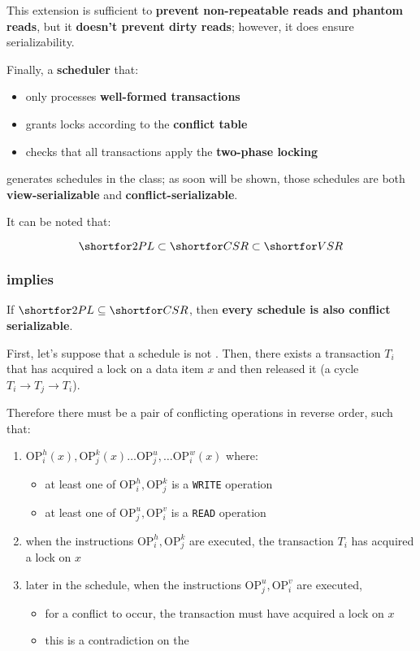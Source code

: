\documentclass[english]{article}
\begin{document}
This extension is sufficient to \textbf{prevent non-repeatable reads and phantom reads}, but it \textbf{doesn't prevent dirty reads};
however, it does ensure serializability.

\bigskip
Finally, a \textbf{scheduler} that:

\begin{itemize}
  \item only processes \textbf{well-formed transactions}
  \item grants locks according to the \textbf{conflict table}
  \item checks that all transactions apply the \textbf{two-phase locking}
\end{itemize}

generates schedules in the \tpl class;
as soon will be shown, those schedules are both \textbf{view-serializable} and \textbf{conflict-serializable}.

It can be noted that:

\[ \tpl \subset \csr \subset \vsr \]

\subsubsection{\tpl implies \csr}

If \(\tpl \subseteq \csr\), then \textbf{every \tpl schedule is also conflict serializable}.

\bigskip
First, let's suppose that a \tpl schedule is not \csr.
Then, there exists a transaction \(T_i\) that has acquired a lock on a data item \(x\) and then released it (a cycle \(T_i \rightarrow T_j \rightarrow T_i\)).

Therefore there must be a pair of conflicting operations in reverse order, such that:

\begin{enumerate}
  \item \(\text{OP}_{i}^{h}(x), \text{OP}_{j}^{k}(x) \ldots \text{OP}_{j}^{u}, \ldots \text{OP}_{i}^{w}(x)\) where:
        \begin{itemize}
          \item at least one of \(\text{OP}_{i}^{h}, \text{OP}_{j}^{k}\) is a \texttt{WRITE} operation
          \item at least one of \(\text{OP}_{j}^{u}, \text{OP}_{i}^{v}\) is a \texttt{READ} operation
        \end{itemize}
  \item when the instructions \(\text{OP}_{i}^{h}, \text{OP}_{j}^{k}\) are executed, the transaction \(T_i\) has acquired a lock on \(x\)
  \item later in the schedule, when the instructions \(\text{OP}_{j}^{u}, \text{OP}_{i}^{v}\) are executed,
        \begin{itemize}
          \item for a conflict to occur, the transaction must have acquired a lock on \(x\)
          \item this is a contradiction on the \tpl
        \end{itemize}
\end{enumerate}
\end{document}
